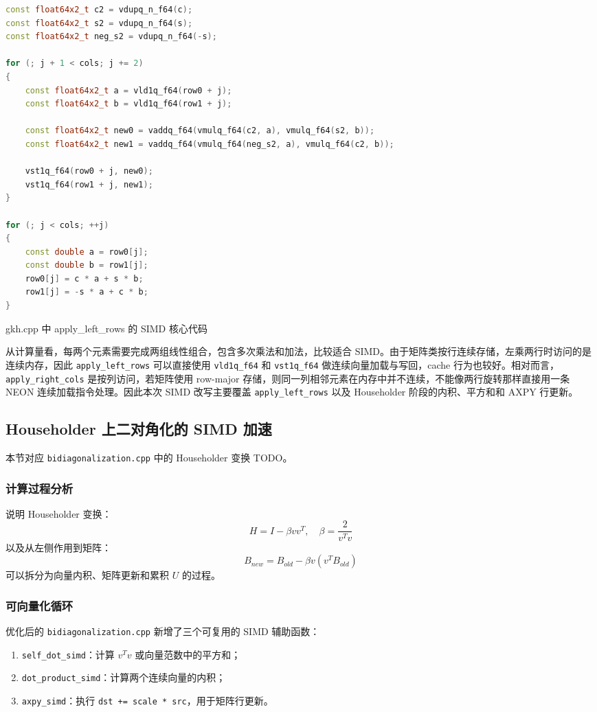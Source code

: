 \documentclass[UTF8,a4paper]{ctexart}
\begin{document}
\begin{algorithm}[H]
\begin{lstlisting}[language=C++]
const float64x2_t c2 = vdupq_n_f64(c);
const float64x2_t s2 = vdupq_n_f64(s);
const float64x2_t neg_s2 = vdupq_n_f64(-s);

for (; j + 1 < cols; j += 2)
{
    const float64x2_t a = vld1q_f64(row0 + j);
    const float64x2_t b = vld1q_f64(row1 + j);

    const float64x2_t new0 = vaddq_f64(vmulq_f64(c2, a), vmulq_f64(s2, b));
    const float64x2_t new1 = vaddq_f64(vmulq_f64(neg_s2, a), vmulq_f64(c2, b));

    vst1q_f64(row0 + j, new0);
    vst1q_f64(row1 + j, new1);
}

for (; j < cols; ++j)
{
    const double a = row0[j];
    const double b = row1[j];
    row0[j] = c * a + s * b;
    row1[j] = -s * a + c * b;
}
\end{lstlisting}
\caption{gkh.cpp 中 apply\_left\_rows 的 SIMD 核心代码}
\label{alg:gkh-left-rows}
\end{algorithm}

从计算量看，每两个元素需要完成两组线性组合，包含多次乘法和加法，比较适合 SIMD。由于矩阵类按行连续存储，左乘两行时访问的是连续内存，因此 \texttt{apply\_left\_rows} 可以直接使用 \texttt{vld1q\_f64} 和 \texttt{vst1q\_f64} 做连续向量加载与写回，cache 行为也较好。相对而言，\texttt{apply\_right\_cols} 是按列访问，若矩阵使用 row-major 存储，则同一列相邻元素在内存中并不连续，不能像两行旋转那样直接用一条 NEON 连续加载指令处理。因此本次 SIMD 改写主要覆盖 \texttt{apply\_left\_rows} 以及 Householder 阶段的内积、平方和和 AXPY 行更新。

\subsection{Householder 上二对角化的 SIMD 加速}
本节对应 \texttt{bidiagonalization.cpp} 中的 Householder 变换 TODO。

\subsubsection{计算过程分析}
说明 Householder 变换：
\[
  H = I - \beta vv^T,\quad \beta = \frac{2}{v^Tv}
\]
以及从左侧作用到矩阵：
\[
  B_{new} = B_{old} - \beta v(v^TB_{old})
\]
可以拆分为向量内积、矩阵更新和累积 $U$ 的过程。

\subsubsection{可向量化循环}
优化后的 \texttt{bidiagonalization.cpp} 新增了三个可复用的 SIMD 辅助函数：
\begin{enumerate}
  \item \texttt{self\_dot\_simd}：计算 $v^Tv$ 或向量范数中的平方和；
  \item \texttt{dot\_product\_simd}：计算两个连续向量的内积；
  \item \texttt{axpy\_simd}：执行 \texttt{dst += scale * src}，用于矩阵行更新。
\end{enumerate}
\end{document}
